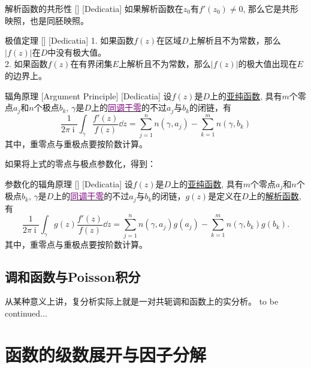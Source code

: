 \documentclass[UTF8]{ctexart}
\newcommand{\hyperrefc}[2]{\hyperref[#1]{\textcolor{purple}{#2}}}
\newcommand{\continued}{{\Large to be continued...}}
\DeclareMathOperator{\ii}{\mathrm{i}}
\newcommand{\AnalyticalFunction}{\hyperref[dfn:AnalyticalFunction]{解析函数}}
\newcommand{\MeromorphicFunction}{\hyperref[dfn:MeromorphicFunction]{亚纯函数}}
\begin{document}
\begin{crl}
    [UUID]
    {解析函数的共形性}
    []
    [Dedicatia]
    如果解析函数在$z_0$有$f'(z_0)\neq 0$, 那么它是共形映照，也是同胚映照。
\end{crl}
\begin{thm}
    [UUID]
    {极值定理}
    []
    [Dedicatia]
    1. 如果函数$f(z)$在区域$D$上解析且不为常数，那么$|f(z)|$在$D$中没有极大值。\\
    2. 如果函数$f(z)$在有界闭集$E$上解析且不为常数，那么$|f(z)|$的极大值出现在$E$的边界上。
\end{thm}
\begin{crl}
    [UUID]
    {辐角原理}
    [Argument Principle]
    [Dedicatia]
    设$f(z)$是$D$上的\MeromorphicFunction , 具有$m$个零点$a_j$和$n$个极点$b_k$, $\gamma$是$D$上的\hyperrefc{dfn:NullHomologous}{同调于零}的不过$a_j$与$b_k$的闭链，有
    \[\frac{1}{2\pi\ii}\int_\gamma\frac{f'(z)}{f(z)}\dd{z}=\sum_{j = 1}^{n} n(\gamma,a_j)-\sum_{k = 1}^{m} n(\gamma,b_k)  \]
    其中，重零点与重极点要按阶数计算。
\end{crl}
如果将上式的零点与极点参数化，得到：
\begin{crl}
    [UUID]
    {参数化的辐角原理}
    []
    [Dedicatia]
    设$f(z)$是$D$上的\MeromorphicFunction , 具有$m$个零点$a_j$和$n$个极点$b_k$, $\gamma$是$D$上的\hyperrefc{dfn:NullHomologous}{同调于零}的不过$a_j$与$b_k$的闭链，$g(z)$是定义在$D$上的\AnalyticalFunction , 有
    \[\frac{1}{2\pi\ii}\int_\gamma g(z)\frac{f'(z)}{f(z)}\dd{z}=\sum_{j = 1}^{n} n(\gamma,a_j)g(a_j)-\sum_{k = 1}^{m} n(\gamma,b_k)g(b_k).  \]
    其中，重零点与重极点要按阶数计算。
\end{crl}
\subsection{调和函数与Poisson积分}
从某种意义上讲，复分析实际上就是一对共轭调和函数上的实分析。
\continued

\section{函数的级数展开与因子分解}
\end{document}
